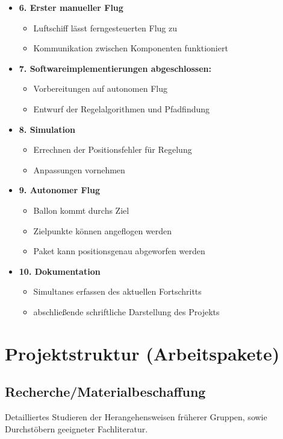\documentclass[lang=ngerman,inputenc=utf8,fontsize=10pt]{ldvarticle}
\begin{document}
\begin{itemize}
\item \textbf{6. Erster manueller Flug}
\begin{itemize}
\item Luftschiff lässt ferngesteuerten Flug zu
\item Kommunikation zwischen Komponenten funktioniert
\end{itemize}
\item \textbf{7. Softwareimplementierungen abgeschlossen:}
\begin{itemize}
\item Vorbereitungen auf autonomen Flug 
\item Entwurf der Regelalgorithmen und Pfadfindung
\end{itemize}
\item \textbf{8. Simulation}
\begin{itemize}
\item Errechnen der Positionsfehler für Regelung
\item Anpassungen vornehmen
\end{itemize}
\item \textbf{9. Autonomer Flug}
\begin{itemize}
\item Ballon kommt durchs Ziel
\item Zielpunkte können angeflogen werden
\item Paket kann positionsgenau abgeworfen werden
\end{itemize}
\item \textbf{10. Dokumentation}
\begin{itemize}
\item Simultanes erfassen des aktuellen Fortschritts
\item abschließende schriftliche Darstellung des Projekts
\end{itemize}


\end{itemize}

\section{Projektstruktur (Arbeitspakete)}


\subsection*{Recherche/Materialbeschaffung}

Detailliertes Studieren der Herangehensweisen früherer Gruppen, sowie Durchstöbern geeigneter Fachliteratur.
\end{document}
